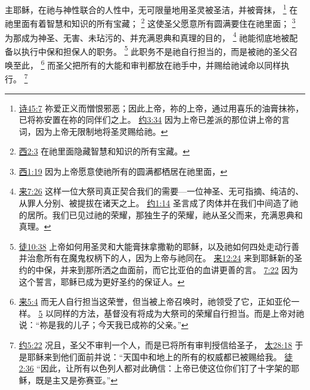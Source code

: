 \documentclass[12pt, a4paper, oneside]{ctexart}
\newcounter{parnum}[section]
\newcommand{\N}{%
   \noindent\refstepcounter{parnum}%
    \makebox[\parindent][l]{\textbf{\arabic{parnum}.}}}
\begin{document}
\N 主耶稣，在祂与神性联合的人性中，无可限量地用圣灵被圣洁，并被膏抹，
	\footnote {
		\href{https://biblehub.com/psalms/45-7.htm}{诗45:7} 祢爱正义而憎恨邪恶；因此上帝，祢的上帝，通过用喜乐的油膏抹祢，已将祢安置在祢的同伴们之上。
		\href{https://biblehub.com/john/3-34.htm}{约3:34} 因为上帝已差派的那位讲上帝的言词，因为上帝无限制地将圣灵赐给祂。
	}
	在祂里面有着智慧和知识的所有宝藏；
	\footnote {
		\href{https://biblehub.com/colossians/2-3.htm}{西2:3} 在祂里面隐藏智慧和知识的所有宝藏。
	}
	这使圣父愿意所有圆满要住在祂里面；
	\footnote {
		\href{https://biblehub.com/colossians/1-19.htm}{西1:19} 因为上帝愿意使祂所有的圆满都栖居在祂里面，
	}
	为那成为神圣、无害、未玷污的、并充满恩典和真理的目的，
	\footnote {
		\href{https://biblehub.com/hebrews/7-26.htm}{来7:26} 这样一位大祭司真正契合我们的需要---一位神圣、无可指摘、纯洁的、从罪人分别、被提拔在诸天之上。
		\href{https://biblehub.com/john/1-14.htm}{约1:14} 圣言成了肉体并在我们中间造了祂的居所。我们已见过祂的荣耀，那独生子的荣耀，祂从圣父而来，充满恩典和真理。
	}
	祂能彻底地被配备以执行中保和担保人的职务。
	\footnote {
		\href{https://biblehub.com/acts/10-38.htm}{徒10:38} 上帝如何用圣灵和大能膏抹拿撒勒的耶稣，以及祂如何四处走动行善并治愈所有在魔鬼权柄下的人，因为上帝与祂同在。
		\href{https://biblehub.com/hebrews/12-24.htm}{来12:24} 来到耶稣新的圣约的中保，并来到那所洒之血面前，而它比亚伯的血讲更善的言。
		\href{https://biblehub.com/hebrews/7-22.htm}{7:22} 因为这个誓言，耶稣已成为更好圣约的保证人。
	}
	此职务不是祂自行担当的，而是被祂的圣父召唤至此，
	\footnote {
		\href{https://biblehub.com/hebrews/5-4.htm}{来5:4} 而无人自行担当这荣誉，但当被上帝召唤时，祂领受了它，正如亚伦一样。
		\href{https://biblehub.com/hebrews/5-5.htm}{5} 以同样的方法，基督没有将成为大祭司的荣耀自行担当。而是上帝对祂说：“祢是我的儿子；今天我已成祢的父亲。”
	}
	而圣父把所有的大能和审判都放在祂手中，并赐给祂诫命以同样执行。
	\footnote {
		\href{https://biblehub.com/john/5-22.htm}{约5:22} 况且，圣父不审判一个人，而是已将所有审判授信给圣子，
		\href{https://biblehub.com/matthew/28-18.htm}{太28:18} 于是耶稣来到他们面前并说：“天国中和地上的所有的权威都已被赐给我。
		\href{https://biblehub.com/acts/2-36.htm}{徒2:36} “因此，让所有以色列人都对此确信：上帝已使这位你们钉了十字架的耶稣，既是主又是弥赛亚。”
	}
\end{document}
